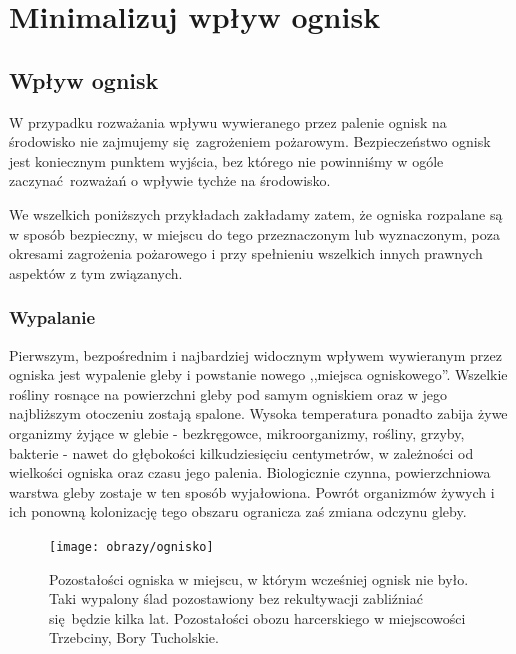 
\chapter{Minimalizuj wpływ ognisk}
\label{rule4-fire}

\section{Wpływ ognisk}

W przypadku rozważania wpływu wywieranego przez palenie ognisk na środowisko nie zajmujemy się zagrożeniem pożarowym. Bezpieczeństwo ognisk jest koniecznym punktem wyjścia, bez którego nie powinniśmy w ogóle zaczynać rozważań o wpływie tychże na środowisko. 

We wszelkich poniższych przykładach zakładamy zatem, że ogniska rozpalane są w sposób bezpieczny, w miejscu do tego przeznaczonym lub wyznaczonym, poza okresami zagrożenia pożarowego i przy spełnieniu wszelkich innych prawnych aspektów z tym związanych.

\subsection{Wypalanie}

Pierwszym, bezpośrednim i najbardziej widocznym wpływem wywieranym przez ogniska jest wypalenie gleby i powstanie nowego ,,miejsca ogniskowego''. Wszelkie rośliny rosnące na powierzchni gleby pod samym ogniskiem oraz w jego najbliższym otoczeniu zostają spalone. Wysoka temperatura ponadto zabija żywe organizmy żyjące w glebie - bezkręgowce, mikroorganizmy, rośliny, grzyby, bakterie -  nawet do głębokości kilkudziesięciu centymetrów, w zależności od wielkości ogniska oraz czasu jego palenia.
Biologicznie czynna, powierzchniowa warstwa gleby zostaje w ten sposób wyjałowiona. Powrót organizmów żywych i ich ponowną kolonizację tego obszaru ogranicza zaś zmiana odczynu gleby.

\begin{figure}[!hb]
\end{figure}


\begin{figure}
	\begin{center}
		\texttt{[image: obrazy/ognisko]}
	\end{center}
	\caption[Wypalone ognisko.]{Pozostałości ogniska w miejscu, w którym wcześniej ognisk nie było. Taki wypalony ślad pozostawiony bez rekultywacji zabliźniać się będzie kilka lat. Pozostałości obozu harcerskiego w miejscowości Trzebciny, Bory Tucholskie.}
\end{figure}

